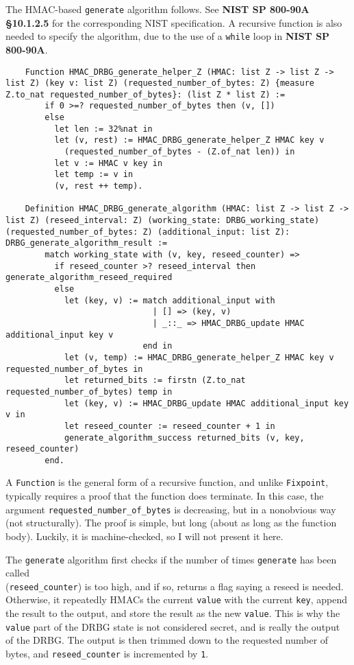 \documentclass[pageno]{jpaper}
\newcommand{\stdtitle}[1]{\textbf{#1}}
\begin{document}
The HMAC-based \lstinline{generate} algorithm follows. See \stdtitle{NIST SP 800-90A \S 10.1.2.5} for the corresponding NIST specification. A recursive function is also needed to specify the algorithm, due to the use of a \lstinline{while} loop in \stdtitle{NIST SP 800-90A}.


\begin{lstlisting}
    Function HMAC_DRBG_generate_helper_Z (HMAC: list Z -> list Z -> list Z) (key v: list Z) (requested_number_of_bytes: Z) {measure Z.to_nat requested_number_of_bytes}: (list Z * list Z) :=
        if 0 >=? requested_number_of_bytes then (v, [])
        else
          let len := 32%nat in
          let (v, rest) := HMAC_DRBG_generate_helper_Z HMAC key v
            (requested_number_of_bytes - (Z.of_nat len)) in
          let v := HMAC v key in
          let temp := v in
          (v, rest ++ temp).

    Definition HMAC_DRBG_generate_algorithm (HMAC: list Z -> list Z -> list Z) (reseed_interval: Z) (working_state: DRBG_working_state) (requested_number_of_bytes: Z) (additional_input: list Z): DRBG_generate_algorithm_result :=
        match working_state with (v, key, reseed_counter) =>
          if reseed_counter >? reseed_interval then generate_algorithm_reseed_required
          else
            let (key, v) := match additional_input with
                              | [] => (key, v)
                              | _::_ => HMAC_DRBG_update HMAC additional_input key v
                            end in
            let (v, temp) := HMAC_DRBG_generate_helper_Z HMAC key v requested_number_of_bytes in
            let returned_bits := firstn (Z.to_nat requested_number_of_bytes) temp in
            let (key, v) := HMAC_DRBG_update HMAC additional_input key v in
            let reseed_counter := reseed_counter + 1 in
            generate_algorithm_success returned_bits (v, key, reseed_counter)
        end.
\end{lstlisting}

A \lstinline{Function} is the general form of a recursive function, and unlike \lstinline{Fixpoint}, typically requires a proof that the function does terminate. In this case, the argument \lstinline{requested_number_of_bytes} is decreasing, but in a nonobvious way (not structurally). The proof is simple, but long (about as long as the function body). Luckily, it is machine-checked, so I will not present it here.

The \lstinline{generate} algorithm first checks if the number of times \lstinline{generate} has been called\\ (\lstinline{reseed_counter}) is too high, and if so, returns a flag saying a reseed is needed. Otherwise, it repeatedly HMACs the current \lstinline{value} with the current \lstinline{key}, append the result to the output, and store the result as the new \lstinline{value}. This is why the \lstinline{value} part of the DRBG state is not considered secret, and is really the output of the DRBG. The output is then trimmed down to the requested number of bytes, and \lstinline{reseed_counter} is incremented by \lstinline{1}.
\end{document}
